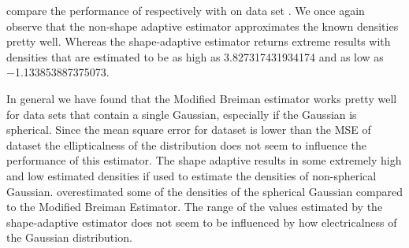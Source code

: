 		 compare the performance of respectively \mbe with \sambe on data set \baakmanFive. We once again observe that the non-shape adaptive estimator approximates the known densities pretty well. Whereas the shape-adaptive estimator returns extreme results with densities that are estimated to be as high as \num{3.827317431934174} and as low as \num{-1.133853887375073}.

		In general we have found that the Modified Breiman estimator works pretty well for data sets that contain a single Gaussian, especially if the Gaussian is spherical. Since the mean square error for dataset \baakmanFive is lower than the MSE of dataset \baakmanFour the ellipticalness of the distribution does not seem to influence the performance of this estimator. 
		The shape adaptive \mbe results in some extremely high and low estimated densities if used to estimate the densities of non-spherical Gaussian. \sambe overestimated some of the densities of the spherical Gaussian compared to the Modified Breiman Estimator. The range of the values estimated by the shape-adaptive estimator does not seem to be influenced by how electricalness of the Gaussian distribution. 